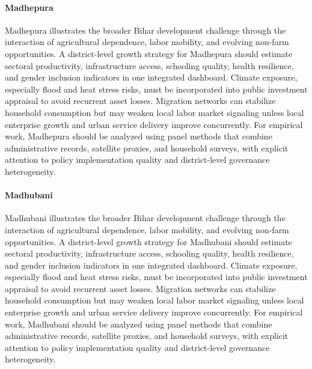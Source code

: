 \documentclass[preprint,12pt]{elsarticle}
\begin{document}
\paragraph{Madhepura} Madhepura illustrates the broader Bihar development challenge through the interaction of agricultural dependence, labor mobility, and evolving non-farm opportunities. A district-level growth strategy for Madhepura should estimate sectoral productivity, infrastructure access, schooling quality, health resilience, and gender inclusion indicators in one integrated dashboard. Climate exposure, especially flood and heat stress risks, must be incorporated into public investment appraisal to avoid recurrent asset losses. Migration networks can stabilize household consumption but may weaken local labor market signaling unless local enterprise growth and urban service delivery improve concurrently. For empirical work, Madhepura should be analyzed using panel methods that combine administrative records, satellite proxies, and household surveys, with explicit attention to policy implementation quality and district-level governance heterogeneity.

\paragraph{Madhubani} Madhubani illustrates the broader Bihar development challenge through the interaction of agricultural dependence, labor mobility, and evolving non-farm opportunities. A district-level growth strategy for Madhubani should estimate sectoral productivity, infrastructure access, schooling quality, health resilience, and gender inclusion indicators in one integrated dashboard. Climate exposure, especially flood and heat stress risks, must be incorporated into public investment appraisal to avoid recurrent asset losses. Migration networks can stabilize household consumption but may weaken local labor market signaling unless local enterprise growth and urban service delivery improve concurrently. For empirical work, Madhubani should be analyzed using panel methods that combine administrative records, satellite proxies, and household surveys, with explicit attention to policy implementation quality and district-level governance heterogeneity.
\end{document}
